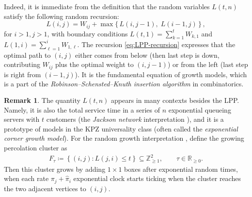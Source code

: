 \documentclass[letterpaper,11pt,oneside,reqno]{article}
\numberwithin{equation}{section}
\theoremstyle{definition}
\newtheorem{remark}[proposition]{Remark}
\begin{document}
Indeed, it is immediate from the definition that the random
variables $L(t,n)$ satisfy the following random recursion:
\begin{equation}\label{eq:LPP-recursion}
L(i,j) = W_{ij} + \max\{\, L(i,j-1),\; L(i-1,j)\,\}\,,
\end{equation}
for $i>1, j>1$, with boundary conditions $L(t,1) =
\sum_{k=1}^t W_{k,1}$ and $L(1,i) =
\sum_{\ell=1}^i W_{1,\ell}$.
The recursion \eqref{eq:LPP-recursion} expresses
that the optimal path to $(i,j)$ either comes from below
(then last step is down, contributing $W_{ij}$ plus the
optimal weight to $(i,j-1)$) or from the left (last step is
right from $(i-1,j)$). It is the fundamental equation of
growth models, which is a part of the
\emph{Robinson--Schensted--Knuth insertion algorithm} in
combinatorics.


\begin{remark}
	The quantity $L(t,n)$ appears in many contexts besides the LPP.
	Namely,
it is also the total
service time in a series of $n$ exponential queueing servers
with $t$ customers (the \emph{Jackson network}
interpretation \cite{Baryshnikov_GUE2001}), and it is a
prototype of models in the KPZ universality class (often
called the \emph{exponential corner growth model}).
For the random growth interpretation \cite{johansson2000shape},
define the growing percolation cluster as
\begin{equation*}
\begin{split}
F_\tau\coloneqq
\left\{ (i,j)\colon L(j,i)\le t \right\} \subseteq \mathbb{Z}_{\ge1}^2,
\qquad \tau \in \mathbb{R}_{\ge0}.
\end{split}
\end{equation*}
Then this cluster grows by adding $1\times 1$ boxes
after exponential random times, when
each rate $\pi_j+\hat \pi_i$
exponential clock starts ticking
when the cluster reaches the two adjacent vertices
to $(i,j)$.
\end{remark}
\end{document}
